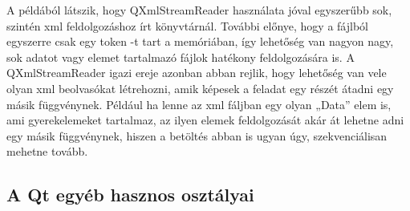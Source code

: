 A példából látszik, 
hogy {\ttfamily QXmlStreamReader} használata jóval egyszerűbb 
sok, szintén xml feldolgozáshoz írt könyvtárnál. 
További előnye, 
hogy a fájlból egyszerre csak egy token -t tart a memóriában, 
így lehetőség van nagyon nagy, 
sok adatot vagy elemet tartalmazó fájlok hatékony feldolgozására is. 
A {\ttfamily QXmlStreamReader} igazi ereje azonban abban rejlik, 
hogy lehetőség van vele olyan xml beolvasókat létrehozni, 
amik képesek a feladat egy részét átadni egy másik függvénynek. 
Például ha lenne az xml fáljban egy olyan {\ttfamily „Data”} elem is, 
ami gyerekelemeket tartalmaz, 
az ilyen elemek feldolgozását akár át lehetne adni egy másik függvénynek, 
hiszen a betöltés abban is ugyan úgy, 
szekvenciálisan mehetne tovább.

\subsection{A Qt egyéb hasznos osztályai}

